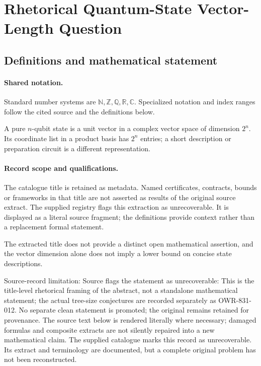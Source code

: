 \documentclass[11pt]{article}
\begin{document}
\section{Rhetorical Quantum-State Vector-Length Question}\label{statement}

\subsection{Definitions and mathematical statement}

\paragraph{Shared notation.}Standard number systems are $\mathbb N,\mathbb Z,\mathbb Q,\mathbb R,\mathbb C$. Specialized notation and index ranges follow the cited source and the definitions below.


A pure $n$-qubit state is a unit vector in a complex vector space of dimension $2^n$. Its coordinate list in a product basis has $2^n$ entries; a short description or preparation circuit is a different representation.
\paragraph{Record scope and qualifications.}
The catalogue title is retained as metadata. Named certificates, contracts, bounds or frameworks in that title are not asserted as results of the original source extract.
The supplied registry flags this extraction as unrecoverable. It is displayed as a literal source fragment; the definitions provide context rather than a replacement formal statement.

The extracted title does not provide a distinct open mathematical assertion, and the vector dimension alone does not imply a lower bound on concise state descriptions.

Source-record limitation: Source flags the statement as unrecoverable: This is the title-level rhetorical framing of the abstract, not a standalone mathematical statement; the actual tree-size conjectures are recorded separately as OWR-831-012. No separate clean statement is promoted; the original remains retained for provenance.
The source text below is rendered literally where necessary; damaged formulas and composite extracts are not silently repaired into a new mathematical claim.
The supplied catalogue marks this record as unrecoverable. Its extract and terminology are documented, but a complete original problem has not been reconstructed.
\end{document}
